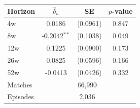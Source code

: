 \begin{tabular}{lccc}
\toprule
Horizon & $\hat{\delta}_h$ & SE & $p$-value \\
\midrule
4w & 0.0186 & (0.0961) & 0.847 \\
8w & -0.2042$^{**}$ & (0.1038) & 0.049 \\
12w & 0.1225 & (0.0900) & 0.173 \\
26w & 0.0825 & (0.0596) & 0.166 \\
52w & -0.0413 & (0.0426) & 0.332 \\
\midrule
Matches & \multicolumn{3}{c}{66,990} \\
Episodes & \multicolumn{3}{c}{2,036} \\
\bottomrule
\end{tabular}
